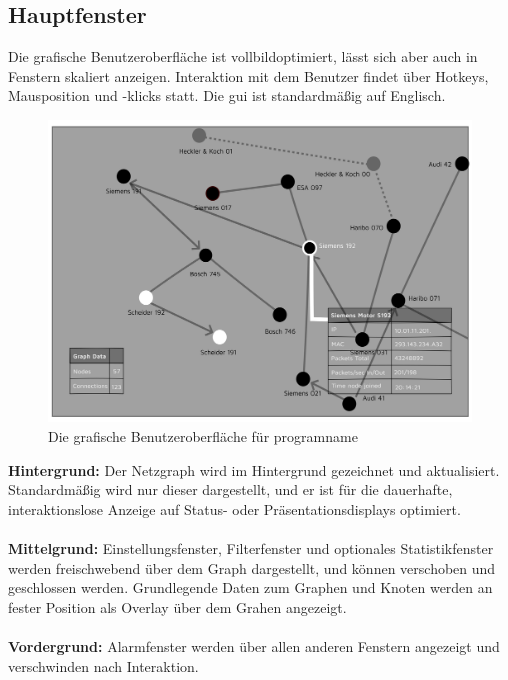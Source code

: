 \chapter{}

\section{Hauptfenster}
Die grafische Benutzeroberfläche ist vollbildoptimiert, lässt sich aber auch in
Fenstern skaliert anzeigen. Interaktion mit dem Benutzer findet über Hotkeys,
Mausposition und -klicks statt.
Die \gls{gui} ist standardmäßig auf Englisch.

  \begin{figure}[h!]
    \hspace*{0.15cm}\includegraphics[scale=0.07]{./img/GUI.png}
    \caption[Die grafische Benutzeroberfläche für \gls{programname}]{Die grafische Benutzeroberfläche für \gls{programname}}
  \end{figure}

\noindent \textbf{Hintergrund:} Der Netzgraph wird im Hintergrund gezeichnet und
aktualisiert. Standardmäßig wird nur dieser dargestellt, und er ist für die
dauerhafte, interaktionslose Anzeige auf Status- oder Präsentationsdisplays
optimiert.
\\ \\
\textbf{Mittelgrund:} Einstellungsfenster, Filterfenster und optionales Statistikfenster
werden freischwebend über dem Graph dargestellt, und können verschoben und
geschlossen werden. Grundlegende Daten zum Graphen und Knoten werden an fester
Position als Overlay über dem Grahen angezeigt.
\\ \\
\textbf{Vordergrund:} Alarmfenster werden über allen anderen Fenstern angezeigt und
verschwinden nach Interaktion.

